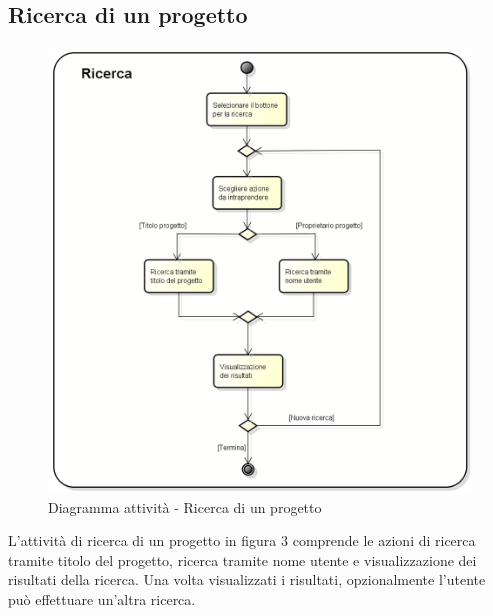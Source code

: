 \subsection{Ricerca di un progetto}
\begin{figure}[h] 
	\centering 
	\includegraphics[scale=0.3] {img/activity_ricerca.png} 
	\caption{Diagramma attività - Ricerca di un progetto} 
\end{figure}
L'attività di ricerca di un progetto in figura 3 comprende le azioni di ricerca tramite titolo del progetto, ricerca tramite nome utente e visualizzazione dei risultati della ricerca. Una volta visualizzati i risultati, opzionalmente l'utente può effettuare un'altra ricerca.
\newpage

